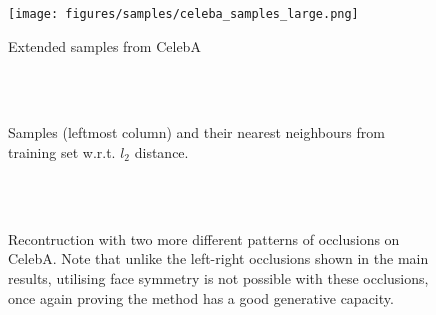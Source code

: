 \documentclass{article}
\begin{document}
\begin{figure}[h!]
    \centering
    \texttt{[image: figures/samples/celeba\_samples\_large.png]}
    \caption{Extended samples from CelebA}
    \label{fig:celeba-samples-large}
\end{figure}


\begin{figure}[h!]
  \centering
     \\
     \\
     \caption{Samples (leftmost column) and their nearest neighbours from training set w.r.t. $l_2$ distance.}
     \label{fig:nn-large}
\end{figure}

\begin{figure}
    \centering
     \\
     \\
     \caption{Recontruction with two more different patterns of occlusions on CelebA. Note that unlike the left-right occlusions shown in the main results, utilising face symmetry is not possible with these occlusions, once again proving the method has a good generative capacity.}
    \label{fig:celeb_a_inpainting}
\end{figure}
\end{document}

